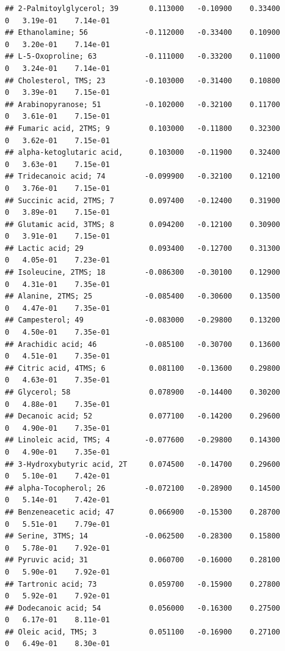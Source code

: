 \documentclass[]{article}
\begin{document}
\begin{verbatim}
## 2-Palmitoylglycerol; 39       0.113000   -0.10900    0.33400         0   3.19e-01    7.14e-01
## Ethanolamine; 56             -0.112000   -0.33400    0.10900         0   3.20e-01    7.14e-01
## L-5-Oxoproline; 63           -0.111000   -0.33200    0.11000         0   3.24e-01    7.14e-01
## Cholesterol, TMS; 23         -0.103000   -0.31400    0.10800         0   3.39e-01    7.15e-01
## Arabinopyranose; 51          -0.102000   -0.32100    0.11700         0   3.61e-01    7.15e-01
## Fumaric acid, 2TMS; 9         0.103000   -0.11800    0.32300         0   3.62e-01    7.15e-01
## alpha-ketoglutaric acid,      0.103000   -0.11900    0.32400         0   3.63e-01    7.15e-01
## Tridecanoic acid; 74         -0.099900   -0.32100    0.12100         0   3.76e-01    7.15e-01
## Succinic acid, 2TMS; 7        0.097400   -0.12400    0.31900         0   3.89e-01    7.15e-01
## Glutamic acid, 3TMS; 8        0.094200   -0.12100    0.30900         0   3.91e-01    7.15e-01
## Lactic acid; 29               0.093400   -0.12700    0.31300         0   4.05e-01    7.23e-01
## Isoleucine, 2TMS; 18         -0.086300   -0.30100    0.12900         0   4.31e-01    7.35e-01
## Alanine, 2TMS; 25            -0.085400   -0.30600    0.13500         0   4.47e-01    7.35e-01
## Campesterol; 49              -0.083000   -0.29800    0.13200         0   4.50e-01    7.35e-01
## Arachidic acid; 46           -0.085100   -0.30700    0.13600         0   4.51e-01    7.35e-01
## Citric acid, 4TMS; 6          0.081100   -0.13600    0.29800         0   4.63e-01    7.35e-01
## Glycerol; 58                  0.078900   -0.14400    0.30200         0   4.88e-01    7.35e-01
## Decanoic acid; 52             0.077100   -0.14200    0.29600         0   4.90e-01    7.35e-01
## Linoleic acid, TMS; 4        -0.077600   -0.29800    0.14300         0   4.90e-01    7.35e-01
## 3-Hydroxybutyric acid, 2T     0.074500   -0.14700    0.29600         0   5.10e-01    7.42e-01
## alpha-Tocopherol; 26         -0.072100   -0.28900    0.14500         0   5.14e-01    7.42e-01
## Benzeneacetic acid; 47        0.066900   -0.15300    0.28700         0   5.51e-01    7.79e-01
## Serine, 3TMS; 14             -0.062500   -0.28300    0.15800         0   5.78e-01    7.92e-01
## Pyruvic acid; 31              0.060700   -0.16000    0.28100         0   5.90e-01    7.92e-01
## Tartronic acid; 73            0.059700   -0.15900    0.27800         0   5.92e-01    7.92e-01
## Dodecanoic acid; 54           0.056000   -0.16300    0.27500         0   6.17e-01    8.11e-01
## Oleic acid, TMS; 3            0.051100   -0.16900    0.27100         0   6.49e-01    8.30e-01

\end{verbatim}
\end{document}
